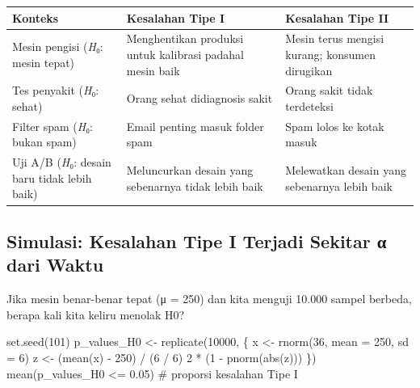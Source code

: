 \documentclass[
  indonesian,
  letterpaper,
]{book}
\newenvironment{Shaded}{\begin{snugshade}}{\end{snugshade}}
\newcommand{\AttributeTok}[1]{\textcolor[rgb]{0.40,0.45,0.13}{#1}}
\newcommand{\CommentTok}[1]{\textcolor[rgb]{0.37,0.37,0.37}{#1}}
\newcommand{\DecValTok}[1]{\textcolor[rgb]{0.68,0.00,0.00}{#1}}
\newcommand{\FloatTok}[1]{\textcolor[rgb]{0.68,0.00,0.00}{#1}}
\newcommand{\FunctionTok}[1]{\textcolor[rgb]{0.28,0.35,0.67}{#1}}
\newcommand{\NormalTok}[1]{\textcolor[rgb]{0.00,0.23,0.31}{#1}}
\newcommand{\OtherTok}[1]{\textcolor[rgb]{0.00,0.23,0.31}{#1}}
\newcommand{\SpecialCharTok}[1]{\textcolor[rgb]{0.37,0.37,0.37}{#1}}
\newcounter{none} %
\begin{document}
{\def\LTcaptype{none} %
\begin{longtable}[]{@{}
  >{\raggedright\arraybackslash}p{}
  >{\raggedright\arraybackslash}p{}
  >{\raggedright\arraybackslash}p{}@{}}
\toprule\noalign{}
\begin{minipage}[b]{\linewidth}\raggedright
Konteks
\end{minipage} & \begin{minipage}[b]{\linewidth}\raggedright
Kesalahan Tipe I
\end{minipage} & \begin{minipage}[b]{\linewidth}\raggedright
Kesalahan Tipe II
\end{minipage} \\
\midrule\noalign{}
\endhead
\bottomrule\noalign{}
\endlastfoot
Mesin pengisi (\emph{H}₀: mesin tepat) & Menghentikan produksi untuk
kalibrasi padahal mesin baik & Mesin terus mengisi kurang; konsumen
dirugikan \\
Tes penyakit (\emph{H}₀: sehat) & Orang sehat didiagnosis sakit & Orang
sakit tidak terdeteksi \\
Filter spam (\emph{H}₀: bukan spam) & Email penting masuk folder spam &
Spam lolos ke kotak masuk \\
Uji A/B (\emph{H}₀: desain baru tidak lebih baik) & Meluncurkan desain
yang sebenarnya tidak lebih baik & Melewatkan desain yang sebenarnya
lebih baik \\
\end{longtable}
}

\subsection{Simulasi: Kesalahan Tipe I Terjadi Sekitar α dari
Waktu}\label{simulasi-kesalahan-tipe-i-terjadi-sekitar-ux3b1-dari-waktu}

Jika mesin benar-benar tepat (μ = 250) dan kita menguji 10.000 sampel
berbeda, berapa kali kita keliru menolak H0?

\begin{Shaded}
\begin{Highlighting}[]
\FunctionTok{set.seed}\NormalTok{(}\DecValTok{101}\NormalTok{)}
\NormalTok{p\_values\_H0 }\OtherTok{\textless{}{-}} \FunctionTok{replicate}\NormalTok{(}\DecValTok{10000}\NormalTok{, \{}
\NormalTok{x }\OtherTok{\textless{}{-}} \FunctionTok{rnorm}\NormalTok{(}\DecValTok{36}\NormalTok{, }\AttributeTok{mean =} \DecValTok{250}\NormalTok{, }\AttributeTok{sd =} \DecValTok{6}\NormalTok{)}
\NormalTok{z }\OtherTok{\textless{}{-}}\NormalTok{ (}\FunctionTok{mean}\NormalTok{(x) }\SpecialCharTok{{-}} \DecValTok{250}\NormalTok{) }\SpecialCharTok{/}\NormalTok{ (}\DecValTok{6} \SpecialCharTok{/} \DecValTok{6}\NormalTok{)}
\DecValTok{2} \SpecialCharTok{*}\NormalTok{ (}\DecValTok{1} \SpecialCharTok{{-}} \FunctionTok{pnorm}\NormalTok{(}\FunctionTok{abs}\NormalTok{(z)))}
\NormalTok{\})}
\FunctionTok{mean}\NormalTok{(p\_values\_H0 }\SpecialCharTok{\textless{}=} \FloatTok{0.05}\NormalTok{) }\CommentTok{\# proporsi kesalahan Tipe I}
\end{Highlighting}
\end{Shaded}
\end{document}
